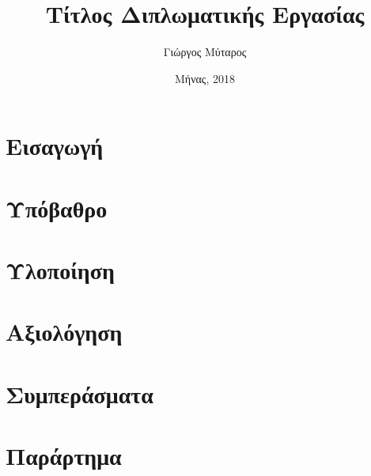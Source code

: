 \documentclass[12pt]{report}
\title{Τίτλος Διπλωματικής Εργασίας}
\author{Γιώργος Μύταρος}
\date{Μήνας, 2018}
\begin{document}



%

\tableofcontents
\chapter{Εισαγωγή}


\chapter{Υπόβαθρο}


\chapter{Υλοποίηση}


\chapter{Αξιολόγηση}


\chapter{Συμπεράσματα}


\chapter{Παράρτημα}


\printbibliography[title={Βιβλιογραφία}]
\end{document}
